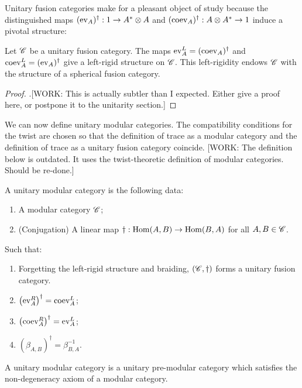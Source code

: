 Unitary fusion categories make for a pleasant object of study because the distinguished maps $(\operatorname{ev}_A)^{\dagger}:1\to A^{*}\otimes A$ and $(\operatorname{coev}_A)^{\dagger}:A\otimes A^{*}\to 1$ induce a pivotal structure:

\begin{proposition} Let $\mathscr{C}$ be a unitary fusion category. The maps $\operatorname{ev}_{A}^L = (\operatorname{coev}_{A})^{\dagger}$ and $\operatorname{coev}^L_{A}=(\operatorname{ev}_A)^{\dagger}$ give a left-rigid structure on $\mathscr{C}$. This left-rigidity endows $\mathscr{C}$ with the structure of a spherical fusion category.
\end{proposition}
\begin{proof}.[WORK: This is actually subtler than I expected. Either give a proof here, or postpone it to the unitarity section.]
\end{proof}

We can now define unitary modular categories. The compatibility conditions for the twist are chosen so that the definition of trace as a modular category and the definition of trace as a unitary fusion category coincide. [WORK: The definition below is outdated. It uses the twist-theoretic definition of modular categories. Should be re-done.]

\begin{definition} A unitary modular category is the following data:

\begin{enumerate}
\item A modular category $\mathscr{C}$;
\item (Conjugation) A linear map $\dagger: \operatorname{Hom}(A,B)\to \operatorname{Hom}(B,A)$ for all $A,B\in \mathscr{C}$.
\end{enumerate}

Such that:

\begin{enumerate}
\item Forgetting the left-rigid structure and braiding, $\left(\mathscr{C},\dagger\right)$ forms a unitary fusion category.
\item $\left(\operatorname{ev}_{A}^R\right)^{\dagger}=\operatorname{coev}_{A}^L$;
\item $\left(\operatorname{coev}_{A}^R\right)^{\dagger}=\operatorname{ev}_{A}^L$;
\item $\left(\beta_{A,B}\right)^{\dagger}=\beta_{B,A}^{-1}$.
\end{enumerate}

\raggedleft\qedsymbol{}
\end{definition}

\begin{definition} A unitary modular category is a unitary pre-modular category which satisfies the non-degeneracy axiom of a modular category.
\end{definition}

